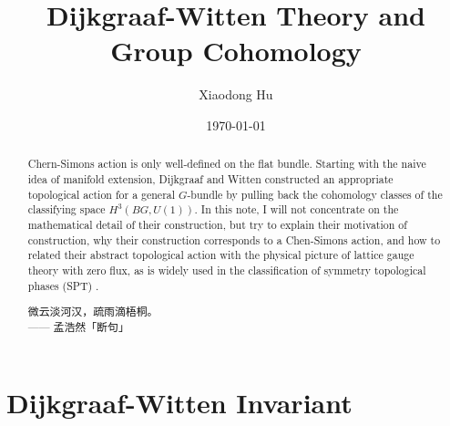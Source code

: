 \documentclass[10pt,nofootinbib,letterpaper]{revtex4}
\newcommand*{\kaishu}{\CJKfamily{kaishu}}
\begin{document}
\title{Dijkgraaf-Witten Theory and Group Cohomology}
\author{Xiaodong Hu}

\date{\today}

\begin{abstract}
	Chern-Simons action is only well-defined on the flat bundle. Starting with the naive idea of manifold extension, Dijkgraaf and Witten \cite{dijkgraaf1990topological} constructed an appropriate topological action for a general $G$-bundle by pulling back the cohomology classes of the classifying space $H^3(BG,U(1))$. In this note, I will not concentrate on the mathematical detail of their construction, but try to explain their motivation of construction, why their construction corresponds to a Chen-Simons action, and how to related their abstract topological action with the physical picture of lattice gauge theory with zero flux, as is widely used in the classification of symmetry topological phases (SPT) \cite{chen2013symmetry}.\par
		\hfill\par
		{\centering\kaishu 微云淡河汉，疏雨滴梧桐。\\[0.5em]}
	\hfill------ 孟浩然「断句」
\end{abstract}

\maketitle
\tableofcontents

\section{Dijkgraaf-Witten Invariant}
\end{document}

